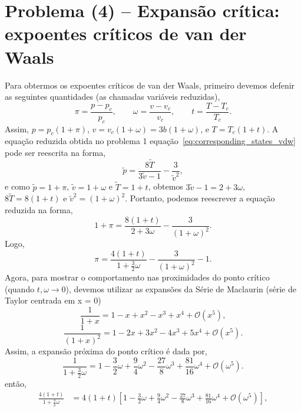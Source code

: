 \documentclass[11pt,a4paper]{article}
\begin{document}
\section*{Problema (4) -- Expansão crítica: expoentes críticos de van der Waals}
%
Para obtermos os expoentes críticos de van der Waals, primeiro devemos defenir as seguintes quantidades (as chamadas variáveis reduzidas),
%
\begin{equation}
    \pi=\frac{p-p_c}{p_c},
    \qquad
    \omega=\frac{v-v_c}{v_c},
    \qquad
    t=\frac{T-T_c}{T_c}.
\end{equation}
%
Assim, $p=p_c(1+\pi)$, $v=v_c(1+\omega)=3b(1+\omega)$,
e $T=T_c(1+t)$. A equação reduzida obtida no problema 1 equação~\ref{eq:corresponding_states_vdw} pode ser reescrita na forma,
%
\begin{equation}
    \tilde p
    =
    \frac{8\tilde T}{3\tilde v-1}
    -
    \frac{3}{\tilde v^2},
\end{equation}
%
e como $\tilde p = 1 + \pi$, $\tilde v=1+\omega$ e $\tilde T = 1+t$,
%
obtemos $3\tilde v-1=2+3\omega$, $8 \tilde T = 8(1+t)$ e $\tilde v^2 = (1+ \omega)^2$.
%
Portanto, podemos reescrever a equação reduzida na forma,
%
\begin{equation}
    1+\pi
    =
    \frac{8(1+t)}{2+3\omega}
    -
    \frac{3}{(1+\omega)^2}.
\end{equation}
%
Logo,
%
\begin{equation}
    \pi
    =
    \frac{4(1+t)}{1+\frac32\omega}
    -
    \frac{3}{(1+\omega)^2}
    -1.
    \label{eq:pi_exact}
\end{equation}
%
Agora, para mostrar o comportamento nas proximidades do ponto crítico (quando $t, \omega \rightarrow 0$), devemos utilizar as expansões da Série de Maclaurin (série de Taylor centrada em x = 0)
%
\begin{equation}
    \frac{1}{1+x}
    =
    1-x+x^2-x^3+x^4+\mathcal{O}(x^5),
\end{equation}
%
\begin{equation}
    \frac{1}{(1+x)^2}
    =
    1-2x+3x^2-4x^3+5x^4+\mathcal{O}(x^5).
\end{equation}
%
Assim, a expansão próxima do ponto crítico é dada por,
%
\begin{equation}
    \frac{1}
    {1+\frac32\omega}
    =
    1
    -\frac32\omega
    +\frac94\omega^2
    -\frac{27}{8}\omega^3
    +\frac{81}{16}\omega^4
    +\mathcal O(\omega^5).
    \label{eq:first_expansion}
\end{equation}
%
então, 
%
\begin{align}
    \frac{4(1+t)}{1+\frac32\omega}
    &=
    4(1+t)
    \left[
    1-\frac32\omega
    +\frac94\omega^2
    -\frac{27}{8}\omega^3
    +\frac{81}{16}\omega^4
    +\mathcal{O}(\omega^5)
    \right],
\end{align}
\end{document}
